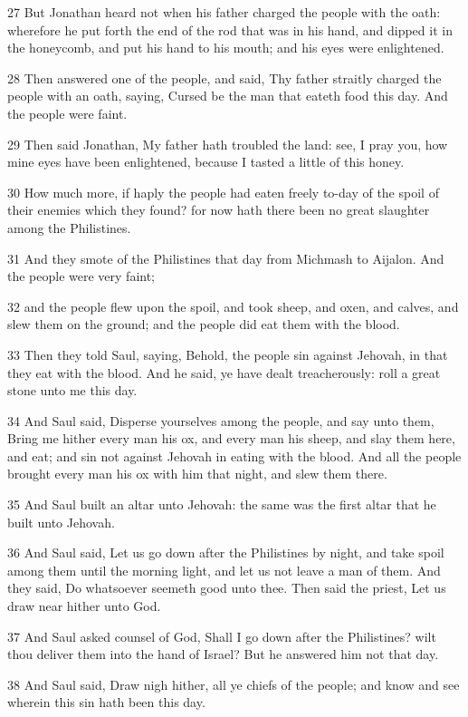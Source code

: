\par 27 But Jonathan heard not when his father charged the people with the oath: wherefore he put forth the end of the rod that was in his hand, and dipped it in the honeycomb, and put his hand to his mouth; and his eyes were enlightened.
\par 28 Then answered one of the people, and said, Thy father straitly charged the people with an oath, saying, Cursed be the man that eateth food this day. And the people were faint.
\par 29 Then said Jonathan, My father hath troubled the land: see, I pray you, how mine eyes have been enlightened, because I tasted a little of this honey.
\par 30 How much more, if haply the people had eaten freely to-day of the spoil of their enemies which they found? for now hath there been no great slaughter among the Philistines.
\par 31 And they smote of the Philistines that day from Michmash to Aijalon. And the people were very faint;
\par 32 and the people flew upon the spoil, and took sheep, and oxen, and calves, and slew them on the ground; and the people did eat them with the blood.
\par 33 Then they told Saul, saying, Behold, the people sin against Jehovah, in that they eat with the blood. And he said, ye have dealt treacherously: roll a great stone unto me this day.
\par 34 And Saul said, Disperse yourselves among the people, and say unto them, Bring me hither every man his ox, and every man his sheep, and slay them here, and eat; and sin not against Jehovah in eating with the blood. And all the people brought every man his ox with him that night, and slew them there.
\par 35 And Saul built an altar unto Jehovah: the same was the first altar that he built unto Jehovah.
\par 36 And Saul said, Let us go down after the Philistines by night, and take spoil among them until the morning light, and let us not leave a man of them. And they said, Do whatsoever seemeth good unto thee. Then said the priest, Let us draw near hither unto God.
\par 37 And Saul asked counsel of God, Shall I go down after the Philistines? wilt thou deliver them into the hand of Israel? But he answered him not that day.
\par 38 And Saul said, Draw nigh hither, all ye chiefs of the people; and know and see wherein this sin hath been this day.
